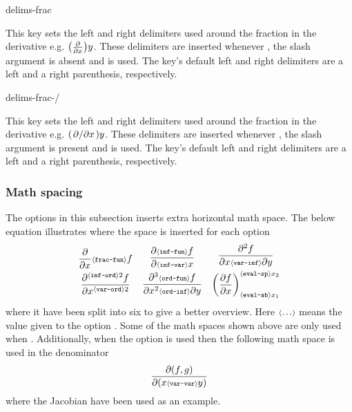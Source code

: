 	\begin{option}{delims-frac}
		\begin{values}[default = (~)]
		\end{values}
		This key sets the left and right delimiters used around the fraction in the derivative e.g. $\pdv*[frac=true]{y}{x}$. These delimiters are inserted whenever , the slash argument is absent and  is used. The key's default left and right delimiters are a left and a right parenthesis, respectively.
	\end{option}
	
	\begin{option}{delims-frac-/}
		\begin{values}[default = (~)]
		\end{values}
		This key sets the left and right delimiters used around the fraction in the derivative e.g. $\pdv*[frac=true]{y}/{x}$. These delimiters are inserted whenever , the slash argument is present and  is used. The key's default left and right delimiters are a left and a right parenthesis, respectively.
	\end{option}
	
	\subsubsection*{Math spacing}
	The options in this subsection inserts extra horizontal math space. The below equation illustrates where the space is inserted for each option
	\begin{align*}
		\begin{gathered}
			\frac{ \partial }{ \partial x } \ms{frac-fun} f \\
			\frac{ \partial^{ \ms{inf-ord} 2 } f }{ \partial x^{ \ms{var-ord} 2 } }
		\end{gathered}
		&&
		\begin{gathered}
			\frac{ \partial \ms{inf-fun} f }{ \partial \ms{inf-var} x } \\
			\frac{ \partial^3 \ms{ord-fun} f }{ \partial x^2 \ms{ord-inf} \partial y }
		\end{gathered}
		&&
		\begin{gathered}
			\frac{ \partial^2 f }{ \partial x \ms{var-inf} \partial y }   \\
			\mleft( \frac{ \partial f}{ \partial x } \mright)_{ \ms{eval-sb} x_1}^{ \ms{eval-sp} x_2}
		\end{gathered}
	\end{align*}
	where it have been split into six to give a better overview. Here ${\scriptstyle\langle\texttt{\dots}\rangle}$ means the value given to the option . Some of the math spaces shown above are only used when . Additionally, when the option  is used then the following math space is used in the denominator
	\begin{equation*}
		\frac{\partial(f, g)}{\partial(x {\scriptstyle\langle\texttt{var-var}\rangle} y)}
	\end{equation*}
	where the Jacobian have been used as an example.
	
